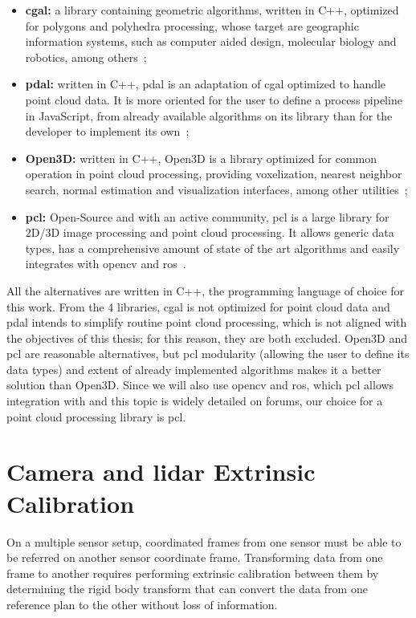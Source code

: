 \begin{itemize}
	\item \textbf{\ac{cgal}:}	a library containing geometric algorithms, written in C++, optimized for polygons and polyhedra processing, whose target are geographic information systems, such as computer aided design, molecular biology and robotics, among others~\cite{CGAL};
	\item \textbf{\ac{pdal}:} written in C++, \ac{pdal} is an adaptation of \ac{cgal} optimized to handle point cloud data. It is more oriented for the user to define a process pipeline in JavaScript, from already available algorithms on its library than for the developer to implement its own~\cite{PDAL};
	\item \textbf{Open3D:} written in C++, Open3D is a library optimized for common operation in point cloud processing, providing voxelization, nearest neighbor search, normal estimation and visualization interfaces, among other utilities~\cite{Open3D};
	\item \textbf{\acf{pcl}:} Open-Source and with an active community, \ac{pcl} is a large library for 2D/3D image processing and point cloud processing. It allows generic data types, has a comprehensive amount of state of the art algorithms and easily integrates with \ac{opencv} and \ac{ros}~\cite{PCL}.
\end{itemize}

All the alternatives are written in C++, the programming language of choice for this work. From the 4 libraries, \ac{cgal} is not optimized for point cloud data and \ac{pdal} intends to simplify routine point cloud processing, which is not aligned with the objectives of this thesis; for this reason, they are both excluded. Open3D and \ac{pcl} are reasonable alternatives, but \ac{pcl} modularity (allowing the user to define its data types) and extent of already implemented algorithms makes it a better solution than Open3D. Since we will also use \ac{opencv} and \ac{ros}, which \ac{pcl} allows integration with and this topic is widely detailed on forums, our choice for a point cloud processing library is \ac{pcl}.

\section{Camera and \acs{lidar} Extrinsic Calibration}
\label{sec:sota:extrinsic_calibration}

On a multiple sensor setup, coordinated frames from one sensor must be able to be referred on another sensor coordinate frame. Transforming data from one frame to another requires performing extrinsic calibration between them by determining the rigid body transform that can convert the data from one reference plan to the other without loss of information.

